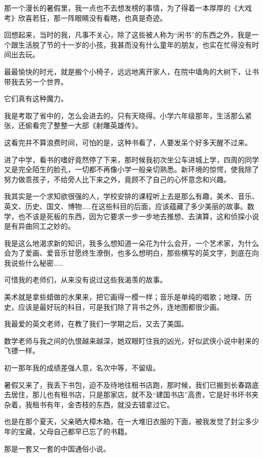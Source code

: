 \par 那一个漫长的暑假里，我一点也不去想发榜的事情，为了得着一本厚厚的《大戏考》欣喜若狂，那一阵眼睛没有看瞎，也真是奇迹。
\par 回想起来，当时的我，凡事不关心，除了这些被人称为“闲书”的东西之外，我是一个跟生活脱了节的十一岁的小孩，我甚而没有什么童年的朋友，也实在忙得没有时间出去玩。
\par 最最愉快的时光，就是搬个小椅子，远远地离开家人，在院中墙角的大树下，让书带我去另一个世界。
\par 它们真有这种魔力。
\par 我是考取了省中的，怎么会进去的，只有天晓得。小学六年级那年，生活那么紧张，还偷看完了整整一大部《射雕英雄传》。
\par 这看完并不算浪费时间，可怕的是，这种书看了，人要发呆个好多天醒不过来。
\par 进了中学，看书的嗜好竟然停了下来，那时候我初次坐公车进城上学，四周的同学又是完全陌生的脸孔，一切都不再像小学一般亲切熟悉。新环境的惊愕，使我除了努力做乖孩子，不给旁人比下来之外，竟顾不了自己的心怀意念和兴趣。
\par 我其实是一个求知欲很强的人，学校安排的课程听上去是那么有趣，美术、音乐、英文、历史、国文、博物……在这些科目的后面，应该蕴藏了多少美丽的故事。数学，也不该是死板的东西，因为它要求一步一步地去推想、去演算，这和侦探小说是有异曲同工之妙的。
\par 我是这么地渴求新的知识，我多么想知道一朵花为什么会开，一个艺术家，为什么会为了爱画、爱音乐甘愿终生潦倒，也多么想明白，那些横写的英文字，到底在向我说些什么秘密……
\par 可惜我的老师们，从来没有说过这些我渴羡的故事。
\par 美术就是拿些蜡做的水果来，把它画得一模一样；音乐是单纯的唱歌；地理、历史，应该是最好玩的科目，可是我们除了背书之外，连地图都很少画。
\par 我最爱的英文老师，在教了我们一学期之后，又去了美国。
\par 数学老师与我之间的仇恨越来越深，她双眼盯住我的凶光，好似武侠小说中射来的飞镖一样。
\par 初一那年我的成绩差强人意，名次中等，不留级。
\par 暑假又来了，我丢下书包，迫不及待地往租书店跑，那时候，我们已搬到长春路底去居住，那儿也有租书店，只是那家店，就不及“建国书店”高贵，它是好书坏书夹杂着，我租书有年，金杏枝的东西，就没去错拿过它。
\par 也是在那个夏天，父亲晒大樟木箱，在一大堆旧衣服的下面，被我发觉了封尘多少年的宝藏，父母自己都早已忘了的书籍。
\par 那是一套又一套的中国通俗小说。

